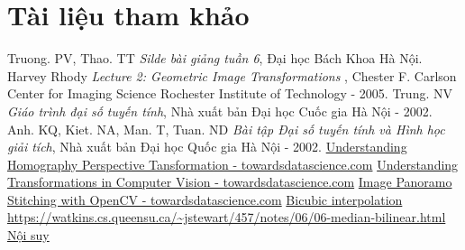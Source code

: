 \documentclass{article}
\begin{document}
\section{Tài liệu tham khảo}
        \begin{thebibliography}{9}
    Truong. PV, Thao. TT \emph{Silde bài giảng tuần 6}, Đại học Bách Khoa Hà Nội.
        Harvey Rhody \emph{Lecture 2: Geometric Image Transformations
}, Chester F. Carlson Center for Imaging Science
Rochester Institute of Technology - 2005.
        Trung. NV \emph{Giáo trình đại số tuyến tính}, Nhà xuất bản Đại học Cuốc gia Hà Nội - 2002.
        Anh. KQ, Kiet. NA, Man. T, Tuan. ND \emph{Bài tập Đại số tuyến tính và Hình học giải tích}, Nhà xuất bản Đại học Quốc gia Hà Nội - 2002.
    \href{https://towardsdatascience.com/understanding-homography-a-k-a-perspective-transformation-cacaed5ca17}{Understanding Homography Perspective Tansformation - towardsdatascience.com}
    \href{https://towardsdatascience.com/understanding-transformations-in-computer-vision-b001f49a9e61}{Understanding Transformations in Computer Vision - towardsdatascience.com}
    \href{https://towardsdatascience.com/image-panorama-stitching-with-opencv-2402bde6b46c}{Image Panoramo Stitching with OpenCV - towardsdatascience.com}
    \href{https://en.wikipedia.org/wiki/Bicubic_interpolation}{Bicubic interpolation}
    \url{https://watkins.cs.queensu.ca/~jstewart/457/notes/06/06-median-bilinear.html}
    \href{https://vi.wikipedia.org/wiki/N%E1%BB%99i_suy}{Nội suy}
    \end{thebibliography}
\end{document}
